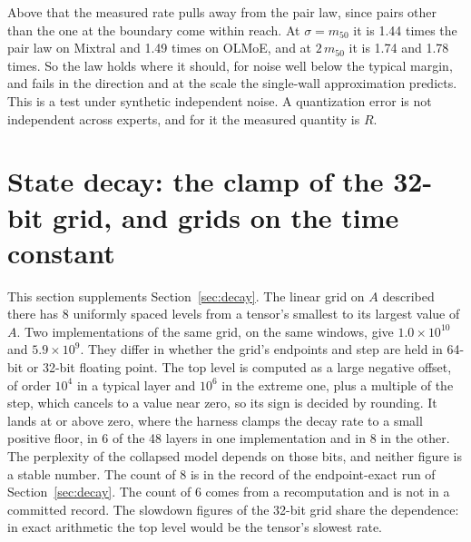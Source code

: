 \documentclass[journal,onecolumn]{IEEEtran}
\begin{document}
Above that the measured rate pulls away from the pair law, since pairs other than the one at the
boundary come within reach. At $\sigma = m_{50}$ it is 1.44 times the pair law on Mixtral and
1.49 times on OLMoE, and at $2\,m_{50}$ it is 1.74 and 1.78 times. So the law holds where it
should, for noise well below the typical margin, and fails in the direction and at the scale the
single-wall approximation predicts. This is a test under synthetic independent noise. A
quantization error is not independent across experts, and for it the measured quantity is $R$.

\section{State decay: the clamp of the 32-bit grid, and grids on the time constant}\label{supp:decay}

This section supplements Section~\ref{sec:decay}. The linear grid on $A$ described there has 8
uniformly spaced levels from a tensor's smallest to its largest value of $A$. Two implementations of the same
grid, on the same windows, give $1.0\times10^{10}$ and $5.9\times10^{9}$. They differ in whether
the grid's endpoints and step are held in 64-bit or 32-bit floating point. The top level is
computed as a large negative offset, of order $10^{4}$ in a typical layer and $10^{6}$ in the
extreme one, plus a multiple of the step, which cancels to a value
near zero, so its sign is decided by rounding. It lands at or above zero, where the harness clamps
the decay rate to a small positive floor, in 6 of the 48 layers in one implementation and in 8
in the other. The perplexity of the collapsed model depends on those bits, and neither figure is
a stable number. The count of 8 is in the record of the endpoint-exact run of Section~\ref{sec:decay}. The count of
6 comes from a recomputation and is not in a committed record. The slowdown figures of the 32-bit grid share the dependence: in exact arithmetic the top
level would be the tensor's slowest rate. 
\end{document}
